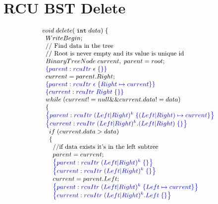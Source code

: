 \makeatletter
\newcommand{\srcsize}{\@setfontsize{\srcsize}{2pt}{2pt}}
\makeatother
{}
\section{RCU BST Delete}
\label{appendix:bst_del}
\[\small
\begin{array}{@{}l@{}}
void\;delete(\;\INT\;data)\;\{\\
 \;\;WriteBegin;\\
   \;\;\text{// Find data in the tree} \\
   \;\;\text{// Root is never empty and its value is unique id} \\
    \;\;BinaryTreeNode \;current,\;parent = root;  \\
    \;\;\specline{parent:rcuItr\; \epsilon \; \{ \} }\\
    \;\;current = parent.Right;\\
    \;\;\specline{parent:rcuItr\; \epsilon \; \{ Right \mapsto current\} }\\
    \;\;\specline{current:rcuItr\; Right \; \{ \} }\\  
    \;\;while\;(current!=null \&\& current.data != data)\\
    \;\;\{\\
        \;\;\specline{parent:rcuItr\; (Left|Right)^{k} \; \{ (Left|Right) \mapsto current\} }\\
        \;\;\specline{current:rcuItr\; (Left|Right)^{k}.(Left|Right) \; \{ \} }\\
        \;\;\;\;if\;(current.data > data)\\
        \;\;\;\;\{\\
            \;\;\;\;\;\;\text{//if data exists it's in the left subtree}\\
            \;\;\;\;\;\;parent = current;\\
            \;\;\;\;\;\;\specline{parent:rcuItr\; (Left|Right)^{k} \; \{ \} }\\
            \;\;\;\;\;\;\specline{current:rcuItr\; (Left|Right)^{k} \; \{ \} }\\
            \;\;\;\;\;\;current = parent.Left;\\
            \;\;\;\;\;\;\specline{parent:rcuItr\; (Left|Right)^{k} \; \{ Left\mapsto current\} }\\
            \;\;\;\;\;\;\specline{current:rcuItr\; (Left|Right)^{k}.Left \; \{ \} }\\

\end{array}\]
